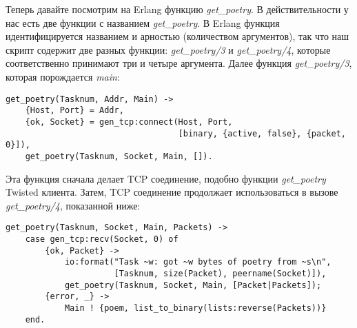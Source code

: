 Теперь давайте посмотрим на Erlang функцию \textit{get\_poetry}. 
В действительности у нас есть две функции с названием \textit{get\_poetry}. 
В Erlang функция идентифицируется названием и арностью (количеством 
аргументов), так что наш скрипт содержит две разных функции: \textit{get\_poetry/3} 
и \textit{get\_poetry/4}, которые соответственно принимают три и четыре аргумента. 
Далее функция \textit{get\_poetry/3}, которая порождается \textit{main}:

 \begin{verbatim}
get_poetry(Tasknum, Addr, Main) ->
    {Host, Port} = Addr,
    {ok, Socket} = gen_tcp:connect(Host, Port,
                                   [binary, {active, false}, {packet, 0}]),
    get_poetry(Tasknum, Socket, Main, []).
\end{verbatim} 


Эта функция сначала делает TCP соединение, подобно функции 
\textit{get\_poetry} Twisted клиента. Затем, TCP соединение 
продолжает использоваться в вызове \textit{get\_poetry/4}, 
показанной ниже:

 \begin{verbatim}
get_poetry(Tasknum, Socket, Main, Packets) ->
    case gen_tcp:recv(Socket, 0) of
        {ok, Packet} ->
            io:format("Task ~w: got ~w bytes of poetry from ~s\n",
                      [Tasknum, size(Packet), peername(Socket)]),
            get_poetry(Tasknum, Socket, Main, [Packet|Packets]);
        {error, _} ->
            Main ! {poem, list_to_binary(lists:reverse(Packets))}
    end.
\end{verbatim} 

